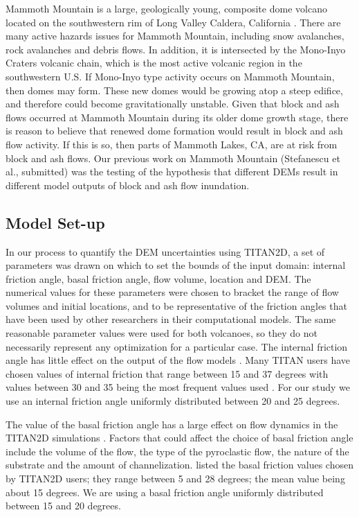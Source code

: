 \documentclass[12pt]{article}
\begin{document}
Mammoth Mountain is a large, geologically young, composite dome
volcano located on the southwestern rim of Long Valley Caldera,
California \citep{Bailey1989}.  There are many active hazards issues
for Mammoth Mountain, including snow avalanches, rock avalanches and
debris flows. In addition, it is intersected by the Mono-Inyo Craters
volcanic chain, which is the most active volcanic region in the
southwestern U.S.  If Mono-Inyo type activity occurs on Mammoth
Mountain, then domes may form.  These new domes would be growing atop
a steep edifice, and therefore could become gravitationally unstable.
Given that block and ash flows occurred at Mammoth Mountain during its
older dome growth stage, there is reason to believe that renewed dome
formation would result in block and ash flow activity. If this is so,
then parts of Mammoth Lakes, CA, are at risk from block and ash flows.
Our previous work on Mammoth Mountain (Stefanescu et al., submitted)
was the testing of the hypothesis that different DEMs result in
different model outputs of block and ash flow inundation.

\subsection{Model Set-up}
\label{subsec: Model Set-up}
In our process to quantify the DEM uncertainties using TITAN2D, a set
of parameters was drawn on which to set the bounds of the input
domain: internal friction angle, basal friction angle, flow volume,
location and DEM. The numerical values for these parameters were
chosen to bracket the range of flow volumes and initial locations, and
to be representative of the friction angles that have been used by
other researchers in their computational models.  The same reasonable
parameter values were used for both volcanoes, so they do not
necessarily represent any optimization for a particular case.  The
internal friction angle has little effect on the output of the flow
models \citep{Keith, sheridan_2005}. Many TITAN users have chosen
values of internal friction that range between 15 and 37 degrees with
values between 30 and 35 being the most frequent values used
\citep{Patra2005, murcia_2010}.  For our study we use an internal
friction angle uniformly distributed between 20 and 25 degrees.

The value of the basal friction angle has a large effect on flow
dynamics in the TITAN2D simulations \citep{Patra2005,
  stinton_2006}. Factors that could affect the choice of basal
friction angle include the volume of the flow, the type of the
pyroclastic flow, the nature of the substrate and the amount of
channelization. \citet{murcia_2010} listed the basal friction values
chosen by TITAN2D users; they range between 5 and 28 degrees; the mean
value being about 15 degrees. We are using a basal friction angle
uniformly distributed between 15 and 20 degrees.
 
\end{document}
